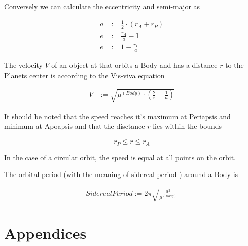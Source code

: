\documentclass[11pt]{report}
\begin{document}
Conversely we can calculate the eccentricity and semi-major as

\begin{align}
  a & := \frac{1}{2}\cdot(r_A + r_P)\\
  e & := \frac{r_A}{a} - 1\\
  e & := 1 - \frac{r_P}{a}
\end{align}

The velocity $V$ of an object at that orbits a Body and has a distance
$r$ to the Planets center is according to the Vis-viva equation
\cite{VisViva}

\begin{align}
V & := \sqrt{\mu^{(Body)} \cdot \left(\frac{2}{r} - \frac{1}{a}\right)}
\end{align}

It should be noted that the speed reaches it's maximum at Periapsis
and minimum at Apoapsis and that the disctance $r$ lies within the
bounds

$$
r_P \leq r \leq r_A
$$

In the case of a circular orbit, the speed is equal at all points on
the orbit.

The  orbital period (with the meaning of
 sidereal period \cite{SIDPER}) around a Body
is

\begin{align}
SiderealPeriod := 2\pi\sqrt{\frac{a^3}{\mu^{(Body)}}}
\end{align}
\part{Appendices}

\printindex
\end{document}
